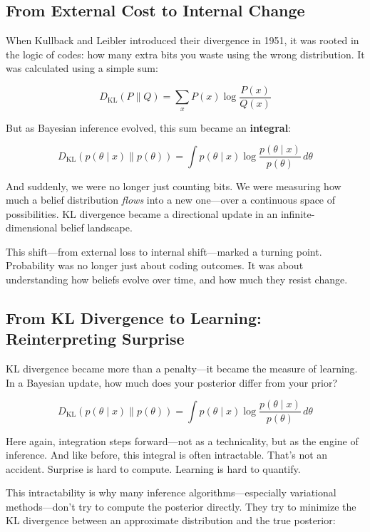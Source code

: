 \subsection{From External Cost to Internal Change}

When Kullback and Leibler introduced their divergence in 1951, it was rooted in the logic of codes: how many extra bits you waste using the wrong distribution. It was calculated using a simple sum:

\[
D_{\mathrm{KL}}(P \parallel Q) = \sum_x P(x) \log \frac{P(x)}{Q(x)}
\]

But as Bayesian inference evolved, this sum became an \textbf{integral}:

\[
D_{\mathrm{KL}}(p(\theta \mid x) \parallel p(\theta)) = \int p(\theta \mid x) \log \frac{p(\theta \mid x)}{p(\theta)} \, d\theta
\]

And suddenly, we were no longer just counting bits. We were measuring how much a belief distribution \emph{flows} into a new one—over a continuous space of possibilities. KL divergence became a directional update in an infinite-dimensional belief landscape.

This shift—from external loss to internal shift—marked a turning point. Probability was no longer just about coding outcomes. It was about understanding how beliefs evolve over time, and how much they resist change.


\subsection{From KL Divergence to Learning: Reinterpreting Surprise}

KL divergence became more than a penalty—it became the measure of learning. In a Bayesian update, how much does your posterior differ from your prior?

\[
D_{\mathrm{KL}}(p(\theta \mid x) \parallel p(\theta)) = \int p(\theta \mid x) \log \frac{p(\theta \mid x)}{p(\theta)} \, d\theta
\]

Here again, integration steps forward—not as a technicality, but as the engine of inference. And like before, this integral is often intractable. That’s not an accident. Surprise is hard to compute. Learning is hard to quantify.

This intractability is why many inference algorithms—especially variational methods—don’t try to compute the posterior directly. They try to minimize the KL divergence between an approximate distribution and the true posterior:

